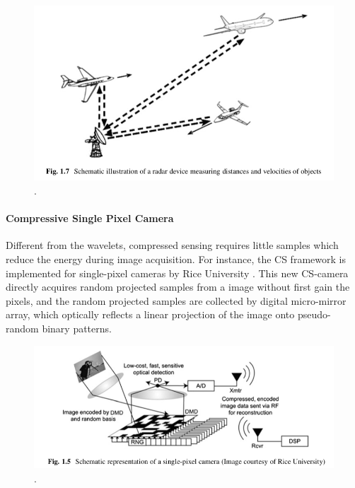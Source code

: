 \begin{figure}
\label{I:cs-radar-intro}
\centering
\includegraphics[width=5.0in]{figs/cs-radar-intro.png}
\DeclareGraphicsExtensions.
\end{figure}

\paragraph{Compressive Single Pixel Camera}
Different from the wavelets, compressed sensing requires little samples which reduce the energy during image acquisition. For instance, the CS framework is implemented for single-pixel cameras by  Rice University \cite{baraniuk2008single}. This new CS-camera directly acquires random projected samples from a image without first gain the pixels, and the random projected samples are collected by digital micro-mirror array, which optically reflects a linear projection of the image onto pseudo-random binary patterns.

\begin{figure}
\centering
\includegraphics[width=5.0in]{figs/cs-camera-intro.png}
\DeclareGraphicsExtensions.
\end{figure}


